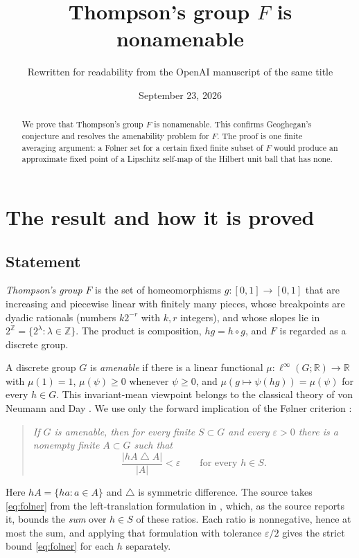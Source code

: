\documentclass[11pt]{article}
\title{Thompson's group \(F\) is nonamenable}
\author{Rewritten for readability from the OpenAI manuscript of the same title}
\date{September 23, 2026}
\newcommand{\R}{\mathbb R}
\newcommand{\Z}{\mathbb Z}
\theoremstyle{definition}
\numberwithin{equation}{section}
\begin{document}
\maketitle
\begin{abstract}
We prove that Thompson's group \(F\) is nonamenable. This confirms
Geoghegan's conjecture and resolves the amenability problem for \(F\).
The proof is one finite averaging argument: a F\o lner set for a certain
fixed finite subset of \(F\) would produce an approximate fixed point of a
Lipschitz self-map of the Hilbert unit ball that has none.
\end{abstract}

\section{The result and how it is proved}\label{sec:introduction}

\subsection{Statement}

\emph{Thompson's group} \(F\) is the set of homeomorphisms
\(g:[0,1]\to[0,1]\) that are increasing and piecewise linear with finitely
many pieces, whose breakpoints are dyadic rationals (numbers \(k2^{-r}\)
with \(k,r\) integers), and whose slopes lie in
\(2^{\Z}=\{2^{\lambda}:\lambda\in\Z\}\). The product is composition,
\(hg=h\circ g\), and \(F\) is regarded as a discrete group.

A discrete group \(G\) is \emph{amenable} if there is a linear functional
\(\mu:\ell^\infty(G;\R)\to\R\) with \(\mu(1)=1\), \(\mu(\psi)\ge0\) whenever
\(\psi\ge0\), and \(\mu(g\mapsto\psi(hg))=\mu(\psi)\) for every \(h\in G\).
This invariant-mean viewpoint belongs to the classical theory of von Neumann
and Day \cite{vonNeumann1929,Day1957}. We use only the forward implication
of the F\o lner criterion \cite{Folner1955}:

\begin{quote}
\emph{If \(G\) is amenable, then for every finite \(S\subset G\) and every
\(\varepsilon>0\) there is a nonempty finite \(A\subset G\) such that}
\begin{equation}\label{eq:folner}
  \frac{|hA\mathbin{\triangle}A|}{|A|}<\varepsilon
  \qquad\text{for every } h\in S .
\end{equation}
\end{quote}
Here \(hA=\{ha:a\in A\}\) and \(\triangle\) is symmetric difference. The
source takes \eqref{eq:folner} from the left-translation formulation in
\cite[Theorem~1.2]{Moore2013}, which, as the source reports it, bounds the
\emph{sum} over \(h\in S\) of these ratios. Each ratio is nonnegative, hence
at most the sum, and applying that formulation with tolerance
\(\varepsilon/2\) gives the strict bound \eqref{eq:folner} for each
\(h\) separately.
\end{document}
